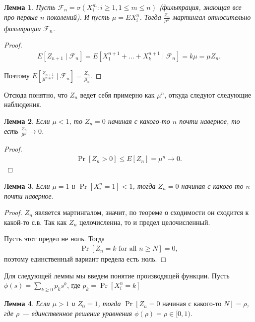 \documentclass[12pt]{article}
\newcommand\F{\mathcal{F}}
\newtheorem{lemma}{Лемма}
\begin{document}
\begin{lemma}
  Пусть $\F_n = \sigma(X_i^m: i \ge 1, 1 \le m \le n)$ (фильтрация, знающая все про первые $n$ поколений). И пусть $\mu = EX_i^n$. Тогда $\frac{Z_n}{\mu^n}$ мартингал относительно фильтрации $\F_n$. 
\end{lemma}
\begin{proof}
  \begin{align*}
    E[Z_{n + 1} \mid \F_n] = E[X_1^{n + 1} + \dots + X_k^{n + 1} \mid \F_n] = k\mu = \mu Z_n.
  \end{align*}

  Поэтому $E[\frac{Z_{n + 1}}{\mu^{n + 1}} \mid \F_n] = \frac{Z_n}{\mu_n}$.
\end{proof}

Отсюда понятно, что $Z_{n}$ ведет себя примерно как $\mu^n$, откуда следуют следующие наблюдения.

\begin{lemma}
  Если $\mu < 1$, то $Z_n = 0$ начиная с какого-то $n$ почти наверное, то есть $\frac{Z_n}{\mu^n} \to 0$.
\end{lemma}
\begin{proof}
  \begin{align*}
    \Pr[Z_n > 0] \le E[Z_n] = \mu^n \to 0.
  \end{align*}
\end{proof}

\begin{lemma}
  Если $\mu = 1$ и $\Pr[X_i^n = 1] < 1$, тогда $Z_n = 0$ начиная с какого-то $n$ почти наверное.
\end{lemma}
\begin{proof}
  $Z_n$ является мартингалом, значит, по теореме о сходимости он сходится к какой-то с.в. Так как $Z_n$ целочисленна, то и предел целочисленный.

  Пусть этот предел не ноль. Тогда 
  \begin{align*}
    \Pr[Z_n = k \text{ for all } n \ge N] = 0,
  \end{align*}
  поэтому единственный вариант предела есть ноль.
\end{proof}

Для следующей леммы мы введем понятие производящей функции. Пусть $\phi(s) = \sum_{k \ge 0} p_k s^k$, где $p_k = \Pr[X_i^n = k]$

\begin{lemma}
  Если $\mu > 1$ и $Z_0 = 1$, тогда $\Pr[Z_n = 0 \text{ начиная с какого-то }N] = \rho$, где $\rho$ --- единственное решение уравнения $\phi(\rho) = \rho \in [0, 1)$.   
\end{lemma}
\end{document}
